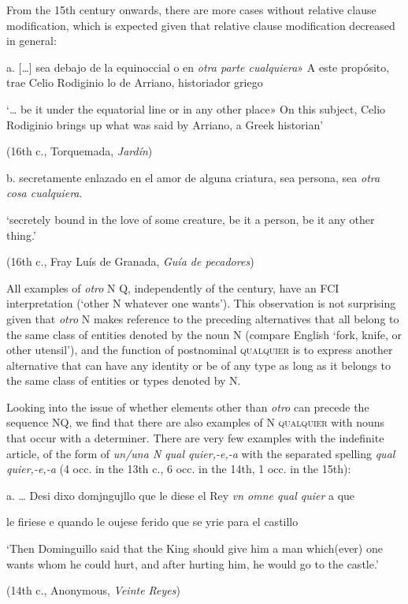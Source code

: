 From the 15th century onwards, there are more cases without relative clause modification, which is expected given that relative clause modification decreased in general:

  a.  […] sea debajo de la equinoccial o en \textit{otra parte cualquiera}» A este propósito, trae Celio Rodiginio lo de Arriano, historiador griego 

    ‘… be it under the equatorial line or in any other place» On this subject, Celio Rodiginio brings up what was said by Arriano, a Greek historian’

    (16th c., Torquemada, \textit{Jardín})

  b.  secretamente enlazado en el amor de alguna criatura, sea persona, sea \textit{otra cosa cualquiera}. 

    ‘secretely bound in the love of some creature, be it a person, be it any other thing.’

    (16th c., Fray Luís de Granada, \textit{Guía de pecadores})

All examples of \textit{otro} N Q, independently of the century, have an FCI interpretation (‘other N whatever one wants’). This observation is not surprising given that \textit{otro} N makes reference to the preceding alternatives that all belong to the same class of entities denoted by the noun N (compare English ‘fork, knife, or other utensil’), and the function of postnominal \textsc{qualquier} is to express another alternative that can have any identity or be of any type as long as it belongs to the same class of entities or types denoted by N.

  Looking into the issue of whether elements other than \textit{otro} can precede the sequence NQ, we find that there are also examples of N \textsc{qualquier} with nouns that occur with a determiner. There are very few examples with the indefinite article, of the form of \textit{un/una N qual quier,-e,-a} with the separated spelling \textit{qual quier,-e,-a} (4 occ. in the 13th c., 6 occ. in the 14th, 1 occ. in the 15th):

  a.  … Desi dixo domjngujllo que le diese el Rey \textit{vn omne qual quier} a que

le firiese e quando le oujese ferido que se yrie para el castillo 

    ‘Then Dominguillo said that the King should give him a man which(ever) one wants whom he could hurt, and after hurting him, he would go to the castle.’

    (14th c., Anonymous, \textit{Veinte Reyes})

